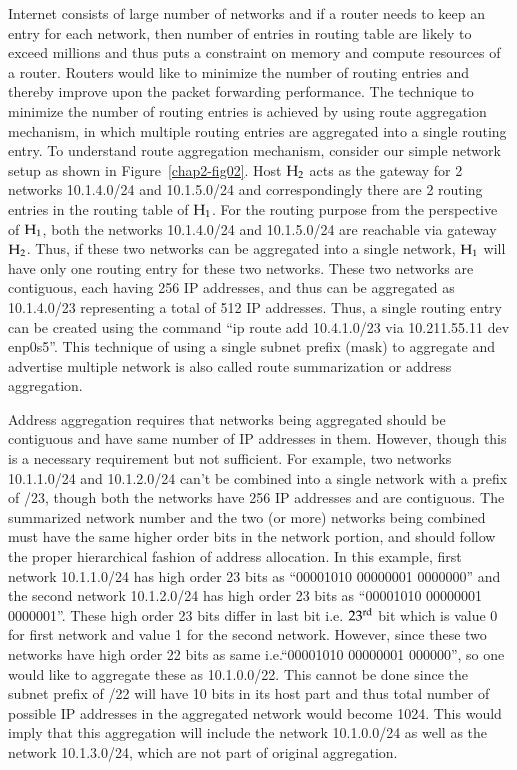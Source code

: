 \begin{multicols}{2}
Internet consists of large number of networks and if a router needs to keep an entry for each network, then number of entries in routing table are likely to exceed millions and thus puts a constraint on memory and compute resources of a router. Routers would like to minimize the number of routing entries and thereby improve upon the packet forwarding performance. The technique to minimize the number of routing entries is achieved by using route aggregation mechanism, in which multiple routing entries are aggregated into a single routing entry. To understand route aggregation mechanism, consider our simple network setup as shown in Figure~\ref{chap2-fig02}. Host ${\rm H}_{2}$ acts as the gateway for 2 networks 10.1.4.0/24 and 10.1.5.0/24 and correspondingly there are 2 routing entries in the routing table of ${\rm H}_{1}$. For the routing purpose from the perspective of ${\rm H}_{1}$, both the networks 10.1.4.0/24 and 10.1.5.0/24 are reachable via gateway ${\rm H}_{2}$. Thus, if these two networks can be aggregated into a single network, ${\rm H}_{1}$ will have only one routing entry for these two networks. These two networks are contiguous, each having 256 IP addresses, and thus can be aggregated as 10.1.4.0/23 representing a total of 512 IP addresses. Thus, a single routing entry can be created using the command “ip route add 10.4.1.0/23 via 10.211.55.11 dev enp0s5”. This technique of using a single subnet prefix (mask) to aggregate and advertise multiple network is also called route summarization or address aggregation.


Address aggregation requires that networks being aggregated should be contiguous and have same number of IP addresses in them. However, though this is a necessary requirement but not sufficient. For example, two networks 10.1.1.0/24 and 10.1.2.0/24 can’t be combined into a single network with a prefix of /23, though both the networks have 256 IP addresses and are contiguous. The summarized network number and the two (or more) networks being combined must have the same higher order bits in the network portion, and should follow the proper hierarchical fashion of address allocation. In this example, first network 10.1.1.0/24 has high order 23 bits as “00001010 00000001 0000000” and the second network 10.1.2.0/24 has high order 23 bits as “00001010 00000001 0000001”. These high order 23 bits differ in last bit i.e. $23^{\rm rd}$ bit which is value 0 for first network and value 1 for the second network. However, since these two networks have high order 22 bits as same i.e.``00001010 00000001 000000”, so one would like to aggregate these as 10.1.0.0/22. This cannot be done since the subnet prefix of /22 will have 10 bits in its host part and thus total number of possible IP addresses in the aggregated network would become 1024.  This would imply that this aggregation will include the network 10.1.0.0/24 as well as the network 10.1.3.0/24, which are not part of original aggregation.


\end{multicols}

